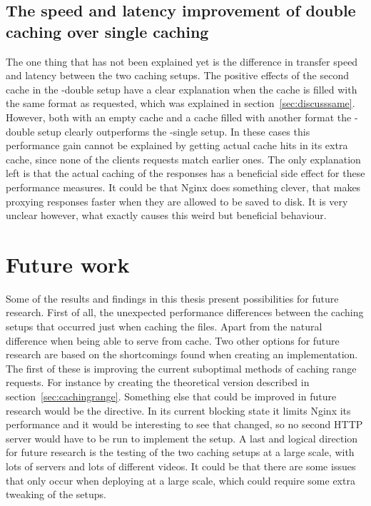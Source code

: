 \documentclass[twoside,openright]{uva-bachelor-thesis}
\begin{document}
\subsection{The speed and latency improvement of double caching over single
caching}\label{sec:weirdstuff}
The one thing that has not been explained yet is the difference in transfer
speed and latency between the two caching \lt setups. The positive effects of
the second cache in the \lt-double setup have a clear explanation when the cache
is filled with the same format as requested, which was explained in
section~\ref{sec:discusssame}. However, both with an empty cache and a cache
filled with another format the \lt-double setup clearly outperforms the
\lt-single setup. In these cases this performance gain cannot be explained by
getting actual cache hits in its extra cache, since none of the clients requests
match earlier ones. The only explanation left is that the actual caching of the
responses has a beneficial side effect for these performance measures. It could
be that Nginx does something clever, that makes proxying responses faster when
they are allowed to be saved to disk. It is very unclear however, what exactly
causes this weird but beneficial behaviour.




\section{Future work}
Some of the results and findings in this thesis present possibilities for future
research. First of all, the unexpected performance differences between the
caching \lt setups that occurred just when caching the files. Apart from the
natural difference when being able to serve from cache. Two other options for
future research are based on the shortcomings found when creating an
implementation. The first of these is improving the current suboptimal methods of
caching range requests. For instance by creating the theoretical version
described in section~\ref{sec:cachingrange}. Something else that could be
improved in future research would be the \ipplong directive. In its current
blocking state it limits Nginx its performance and it would be interesting to
see that changed, so no second HTTP server would have to be run to implement the
\lt setup. A last and logical direction for future research is the testing of
the two caching \lt setups at a large scale, with lots of servers and lots of
different videos. It could be that there are some issues that only occur when
deploying at a large scale, which could require some extra tweaking of the
setups.
\end{document}
